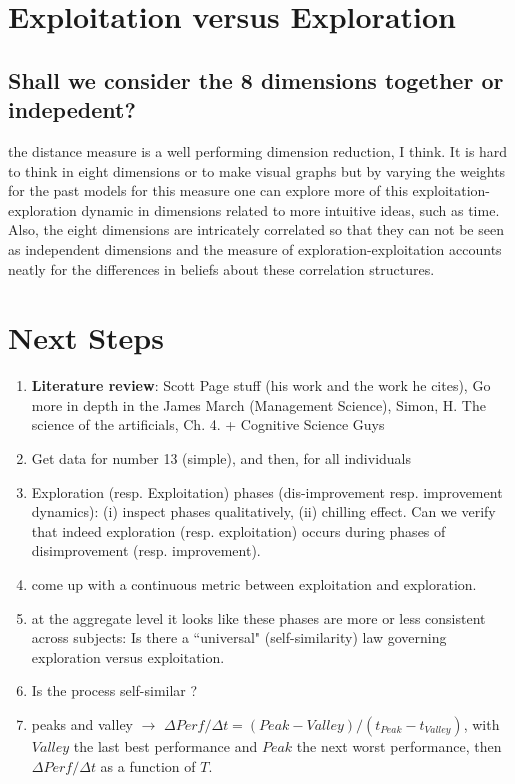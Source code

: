 \documentclass{article}
\begin{document}
  
  
  

\section{Exploitation versus Exploration}



\subsection{Shall we consider the 8 dimensions together or indepedent?}

the distance measure is a well performing dimension reduction, I think.  It is hard to think in eight dimensions or to make visual graphs but by varying the weights for the past models for this measure one can explore more of this exploitation-exploration dynamic in dimensions related to more intuitive ideas, such as time.  Also, the eight dimensions are intricately correlated so that they can not be seen as independent dimensions and the measure of exploration-exploitation accounts neatly for the differences in beliefs about these correlation structures. 

\section{Next Steps}

\begin{enumerate}
\item {\bf Literature review}: Scott Page stuff (his work and the work he cites), Go more in depth in the James March (Management Science), Simon, H. The science of the artificials, Ch. 4. + Cognitive Science Guys
\item Get data for number 13 (simple), and then, for all individuals
\item Exploration (resp. Exploitation) phases (dis-improvement resp. improvement dynamics): (i) inspect phases qualitatively, (ii) chilling effect. Can we verify that indeed exploration (resp. exploitation) occurs during phases of disimprovement (resp. improvement). 
\item come up with a continuous metric between exploitation and exploration.
\item at the aggregate level it looks like these phases are more or less consistent across subjects: Is there a ``universal" (self-similarity) law governing exploration versus exploitation.
\item Is the process self-similar ?
\item peaks and valley $\rightarrow$ $\Delta Perf / \Delta t = (Peak - Valley)/(t_{Peak} - t_{Valley})$, with $Valley$ the last best performance and $Peak$ the next worst performance, then $\Delta Perf / \Delta t$ as a function of $T$.
\end{enumerate}
\end{document}
